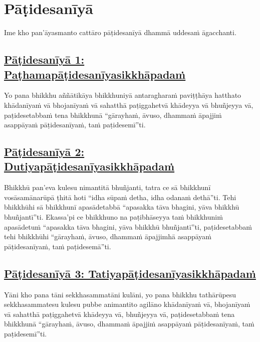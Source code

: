 \section{Pāṭidesanīyā}
\label{pd}

\begin{intro}
  Ime kho pan'āyasmanto cattāro pāṭidesanīyā dhammā uddesaṁ āgacchanti.
\end{intro}

\setsubsecheadstyle{\subsubsectionFmt}
\subsection*{\hyperref[ack1]{Pāṭidesanīyā 1: Paṭhamapāṭidesanīyasikkhāpadaṁ}}
\label{pd1}

Yo pana bhikkhu aññātikāya bhikkhuniyā antaragharaṁ paviṭṭhāya hatthato khādanīyaṁ vā bhojanīyaṁ vā sahatthā paṭiggahetvā khādeyya vā bhuñjeyya vā, paṭidesetabbaṁ tena bhikkhunā “gārayhaṁ, āvuso, dhammaṁ āpajjiṁ asappāyaṁ pāṭidesanīyaṁ, taṁ paṭidesemī”ti.

\subsection*{\hyperref[ack2]{Pāṭidesanīyā 2: Dutiyapāṭidesanīyasikkhāpadaṁ}}
\label{pd2}

Bhikkhū pan'eva kulesu nimantitā bhuñjanti, tatra ce sā bhikkhunī vosāsamānarūpā ṭhitā hoti “idha sūpaṁ detha, idha odanaṁ dethā”ti. Tehi bhikkhūhi sā bhikkhunī apasādetabbā “apasakka tāva bhagini, yāva bhikkhū bhuñjantī”ti. Ekassa'pi ce bhikkhuno na paṭibhāseyya taṁ bhikkhuniṁ apasādetuṁ “apasakka tāva bhagini, yāva bhikkhū bhuñjantī”ti, paṭidesetabbaṁ tehi bhikkhūhi “gārayhaṁ, āvuso, dhammaṁ āpajjimhā asappāyaṁ pāṭidesanīyaṁ, taṁ paṭidesemā”ti.

\subsection*{\hyperref[ack3]{Pāṭidesanīyā 3: Tatiyapāṭidesanīyasikkhāpadaṁ}}
\label{pd3}

Yāni kho pana tāni sekkhasammatāni kulāni, yo pana bhikkhu tathārūpesu sekkhasammatesu kulesu pubbe animantito agilāno khādanīyaṁ vā, bhojanīyaṁ vā sahatthā paṭiggahetvā khādeyya vā, bhuñjeyya vā, paṭidesetabbaṁ tena bhikkhunā “gārayhaṁ, āvuso, dhammaṁ āpajjiṁ asappāyaṁ pāṭidesanīyaṁ, taṁ paṭidesemī”ti.

